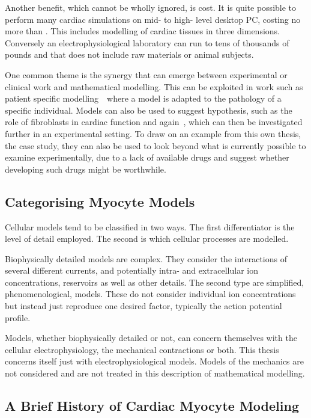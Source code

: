 Another benefit, which cannot be wholly ignored, is cost.
It is quite possible to perform many cardiac simulations on mid- to high- level
desktop PC, costing no more than .
This includes modelling of cardiac tissues in three dimensions.
Conversely an electrophysiological laboratory can run to tens of thousands of
pounds and that does not include raw materials or animal subjects.

One common theme is the synergy that can emerge between experimental or clinical
work and mathematical modelling.
This can be exploited in work such as patient specific
modelling~\cite{Sermesant2006,Ramanathan2006}\ where a model is adapted to the pathology of a
specific individual.
Models can also be used to suggest hypothesis, such as the role of fibroblasts
in cardiac function and again~\cite{Kohl2005}, which can then be investigated
further in an experimental setting.
To draw on an example from this own thesis, the  case study, they can
also be used to look beyond what is currently possible to examine
experimentally, due to a lack of available drugs and suggest whether developing
such drugs might be worthwhile.

\subsection{Categorising Myocyte Models}

Cellular models tend to be classified in two ways.
The first differentiator is the level of detail employed.
The second is which cellular processes are modelled.

Biophysically detailed models are complex.
They consider the interactions of several different currents, and potentially
intra- and extracellular ion concentrations, reservoirs as well as other
details.
The second type are simplified, phenomenological, models.
These do not consider individual ion concentrations but instead just reproduce
one desired factor, typically the action potential profile.

Models, whether biophysically detailed or not, can concern themselves with the
cellular electrophysiology, the mechanical contractions or both.
This thesis concerns itself just with electrophysiological models.
Models of the mechanics are not considered and are not treated in this
description of mathematical modelling.

\subsection{A Brief History of Cardiac Myocyte Modeling}

